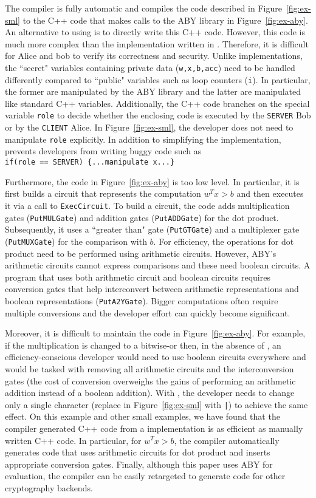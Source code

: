 The \tool compiler is fully automatic and compiles the code described in Figure~\ref{fig:ex-sml} to the C++ code that makes calls to the ABY library  in
Figure~\ref{fig:ex-aby}. An alternative to using \tool is to directly write this C++ code.
However, this code is much more complex than the implementation written in \tool.
Therefore, it is difficult for Alice and bob to verify its correctness and security.
Unlike \tool implementations, the ``secret" variables containing private data ({\tt w,x,b,acc}) need to be handled differently compared to ``public" variables such as loop counters ({\tt i}). In particular, the former are manipulated by the ABY library and the latter are manipulated like standard  C++ variables.
Additionally, the C++ code branches on  the special variable
{\tt role}  to decide whether the enclosing code is executed by the {\tt SERVER} Bob or by
the {\tt CLIENT} Alice. In Figure~\ref{fig:ex-sml}, the developer does not need to
manipulate {\tt role} explicitly. In addition to simplifying the implementation, \tool prevents developers from writing buggy code such as\\
\verb+if(role == SERVER) {...manipulate x...}+

Furthermore, the code in Figure~\ref{fig:ex-aby} is too low level.
In particular, it is first builds a circuit that represents the computation
$w^Tx>b$ and then executes it via a call to {\tt ExecCircuit}.
To build a circuit, the code adds multiplication gates ({\tt PutMULGate})
and addition gates ({\tt PutADDGate}) for the dot product.
Subsequently, it uses a ``greater than" gate ({\tt PutGTGate})
and a multiplexer gate ({\tt PutMUXGate}) for the comparison with $b$.
For efficiency, the operations for dot product need to be performed using 
arithmetic circuits. However, ABY's arithmetic circuits cannot express
comparisons and these need  boolean circuits.
A program that uses both arithmetic circuit and boolean circuits
requires conversion gates that help  interconvert between arithmetic
representations and boolean representations ({\tt PutA2YGate}).
Bigger computations often require multiple conversions and the
developer effort can quickly become significant.

Moreover, it is difficult to maintain the code in Figure~\ref{fig:ex-aby}.
For example, if the multiplication is changed to a bitwise-or then,
in the absence of \tool, an efficiency-conscious developer would need to  use boolean circuits everywhere and would be tasked with removing all arithmetic circuits and the interconversion gates (the cost of  conversion overweighs the gains of performing an arithmetic addition instead of a boolean addition). 
 With \tool, the developer needs to change only a single character (replace {\tt *} in Figure~\ref{fig:ex-sml} with {\tt |}) to achieve the same effect. 
On this example and other small examples, we have found that the compiler generated C++ code from a \tool implementation is as efficient as manually written C++ code. In particular, for $w^Tx>b$, the compiler automatically generates code that uses arithmetic circuits for dot product and inserts appropriate conversion gates. Finally, although this paper uses ABY for evaluation, the  compiler can be easily retargeted to generate code for other cryptography backends.


